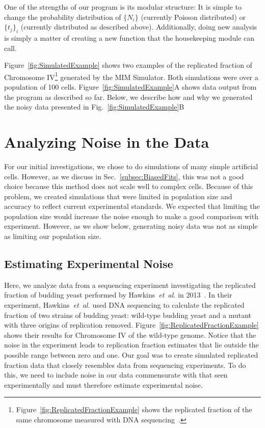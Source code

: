 		One of the strengths of our program is its modular structure: It is simple to change the probability distribution of $\{N_i\}$ (currently Poisson distributed) or $\{t_j\}_i$ (currently distributed as described above).
		Additionally, doing new analysis is simply a matter of creating a new function that the housekeeping module can call.
		
		Figure~\ref{fig:SimulatedExample} shows two examples of the replicated fraction of Chromosome IV\footnote{
		Figure~\ref{fig:ReplicatedFractionExample} shows the replicated fraction of the same chromosome measured with DNA sequencing~\cite{StochasticTermination}.}
		generated by the MIM Simulator.
		Both simulations were over a population of 100 cells.
		Figure~\ref{fig:SimulatedExample}A shows data output from the program as described so far.
		Below, we describe how and why we generated the noisy data presented in Fig.~\ref{fig:SimulatedExample}B
		
		
	\section{Analyzing Noise in the Data}
	\label{sec:Noise}
	
	For our initial investigations, we chose to do simulations of many simple artificial cells.
	However, as we discuss in Sec.~\ref{subsec:BiasedFits}, this was not a good choice because this method does not scale well to complex cells.
	Because of this problem, we created simulations that were limited in population size and accuracy to reflect current experimental standards.
	We expected that limiting the population size would increase the noise enough to make a good comparison with experiment.
	However, as we show below, generating noisy data was not as simple as limiting our population size.
	
	
		\subsection{Estimating Experimental Noise}
		\label{subsec:SequencingNoise}
		
		Here, we analyze data from a sequencing experiment investigating the replicated fraction of budding yeast performed by Hawkins~\emph{et~al.} in 2013~\cite{StochasticTermination}.
		In their experiment, Hawkins~\emph{et~al.} used DNA sequencing to calculate the replicated fraction of two strains of budding yeast: wild-type budding yeast and a mutant with three origins of replication removed.
		Figure~\ref{fig:ReplicatedFractionExample} shows their results for Chromosome IV of the wild-type genome.
		Notice that the noise in the experiment leads to replication fraction estimates that lie outside the possible range between zero and one.
		Our goal was to create simulated replicated fraction data that closely resembles data from sequencing experiments.
		To do this, we need to include noise in our data commensurate with that seen experimentally and must therefore estimate experimental noise.
		
